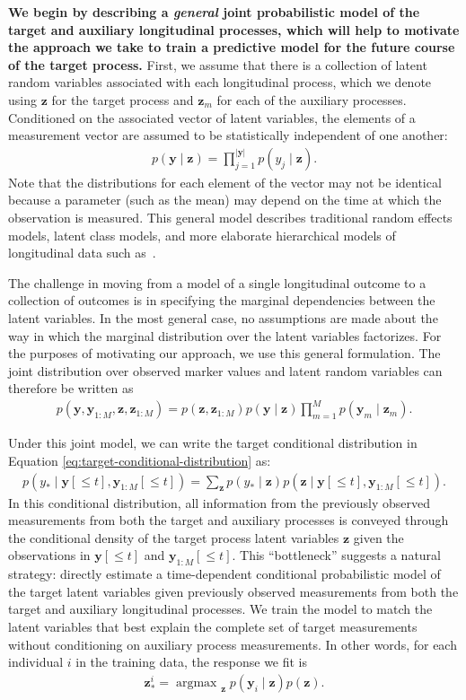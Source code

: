 \documentclass[12pt]{article}
\newcommand{\given}{\mid}
\DeclareMathOperator*{\argmax}{argmax\,\,}
\begin{document}
\textbf{We begin by describing a \emph{general} joint probabilistic model of the target and auxiliary longitudinal processes, which will help to motivate the approach we take to train a predictive model for the future course of the target process.} First, we assume that there is a collection of latent random variables associated with each longitudinal process, which we denote using $\bm{z}$ for the target process and $\bm{z}_m$ for each of the auxiliary processes. Conditioned on the associated vector of latent variables, the elements of a measurement vector are assumed to be statistically independent of one another:
\begin{align}
p(\bm{y} \given \bm{z}) = \prod_{j=1}^{|\bm{y}|} p( y_j \given \bm{z} ).
\end{align}
Note that the distributions for each element of the vector may not be identical because a parameter (such as the mean) may depend on the time at which the observation is measured. This general model describes traditional random effects models, latent class models, and more elaborate hierarchical models of longitudinal data such as~\cite{Schulam2015-ah}.

The challenge in moving from a model of a single longitudinal outcome to a collection of outcomes is in specifying the marginal dependencies between the latent variables. In the most general case, no assumptions are made about the way in which the marginal distribution over the latent variables factorizes. For the purposes of motivating our approach, we use this general formulation. The joint distribution over observed marker values and latent random variables can therefore be written as
\begin{align}
p(\bm{y}, \bm{y}_{1:M}, \bm{z}, \bm{z}_{1:M}) = p(\bm{z}, \bm{z}_{1:M}) p(\bm{y} \given \bm{z}) \prod_{m=1}^M p(\bm{y}_m \given \bm{z}_m).
\end{align}

Under this joint model, we can write the target conditional distribution in Equation \ref{eq:target-conditional-distribution} as:
\begin{align}
\label{eq:predictive-density}
p(y_* \given \bm{y}[\le t], \bm{y}_{1:M}[\le t]) =
	\sum_{\bm{z}} p(y_* \given \bm{z}) p(\bm{z} \given \bm{y}[\le t], \bm{y}_{1:M}[\le t]).
\end{align}
In this conditional distribution, all information from the previously observed measurements from both the target and auxiliary processes is conveyed through the conditional density of the target process latent variables $\bm{z}$ given the observations in $\bm{y}[\le t]$ and $\bm{y}_{1:M}[\le t]$. This ``bottleneck'' suggests a natural strategy: directly estimate a time-dependent conditional probabilistic model of the target latent variables given previously observed measurements from both the target and auxiliary longitudinal processes. We train the model to match the latent variables that best explain the complete set of target measurements without conditioning on auxiliary process measurements. In other words, for each individual $i$ in the training data, the response we fit is
\begin{align}
\bm{z}^i_* = \argmax_{\bm{z}} p(\bm{y}_i \given \bm{z}) p(\bm{z}).
\end{align}
\end{document}

